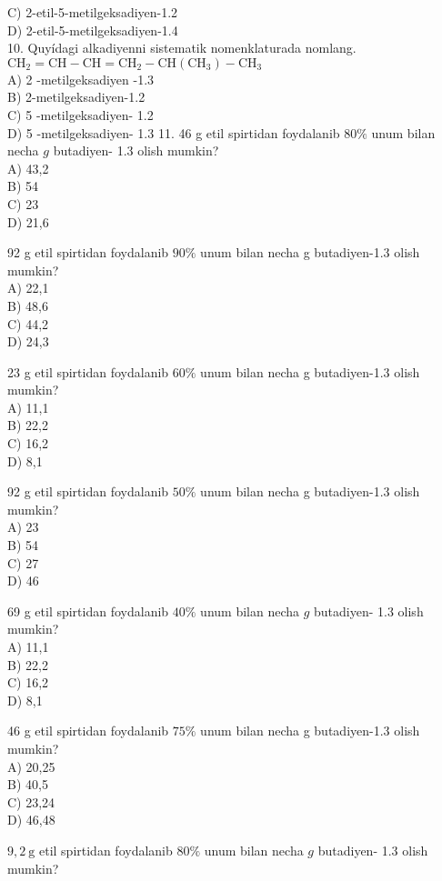 C) 2-etil-5-metilgeksadiyen-1.2\\
D) 2-etil-5-metilgeksadiyen-1.4\\
10. Quyídagi alkadiyenni sistematik nomenklaturada nomlang.\\
$\mathrm{CH}_{2}=\mathrm{CH}-\mathrm{CH}=\mathrm{CH}_{2}-\mathrm{CH}\left(\mathrm{CH}_{3}\right)-\mathrm{CH}_{3}$\\
A) 2 -metilgeksadiyen -1.3\\
B) 2-metilgeksadiyen-1.2\\
C) 5 -metilgeksadiyen- 1.2\\
D) 5 -metilgeksadiyen- 1.3
11. 46 g etil spirtidan foydalanib $80 \%$ unum bilan necha $g$ butadiyen- 1.3 olish mumkin?\\
A) 43,2\\
B) 54\\
C) 23\\
D) 21,6
  \item 92 g etil spirtidan foydalanib $90 \%$ unum bilan necha g butadiyen-1.3 olish mumkin?\\
A) 22,1\\
B) 48,6\\
C) 44,2\\
D) 24,3
  \item 23 g etil spirtidan foydalanib $60 \%$ unum bilan necha g butadiyen-1.3 olish mumkin?\\
A) 11,1\\
B) 22,2\\
C) 16,2\\
D) 8,1
  \item 92 g etil spirtidan foydalanib $50 \%$ unum bilan necha g butadiyen-1.3 olish mumkin?\\
A) 23\\
B) 54\\
C) 27\\
D) 46
  \item 69 g etil spirtidan foydalanib $40 \%$ unum bilan necha $g$ butadiyen- 1.3 olish mumkin?\\
A) 11,1\\
B) 22,2\\
C) 16,2\\
D) 8,1
  \item 46 g etil spirtidan foydalanib $75 \%$ unum bilan necha g butadiyen-1.3 olish mumkin?\\
A) 20,25\\
B) 40,5\\
C) 23,24\\
D) 46,48
  \item $9,2 \mathrm{~g}$ etil spirtidan foydalanib $80 \%$ unum bilan necha $g$ butadiyen- 1.3 olish mumkin?\\
